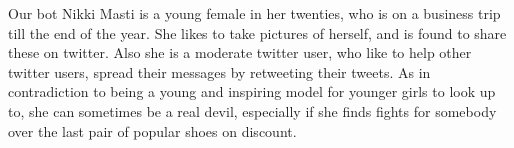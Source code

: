 Our bot Nikki Masti is a young female in her twenties, who is on a business trip till the end of the year. She likes to take pictures of herself, and is found to share these on twitter. Also she is a moderate twitter user, who like to help other twitter users, spread their messages by retweeting their tweets. As in contradiction to being a young and inspiring model for younger girls to look up to, she can sometimes be a real devil, especially if she finds fights for somebody over the last pair of popular shoes on discount.